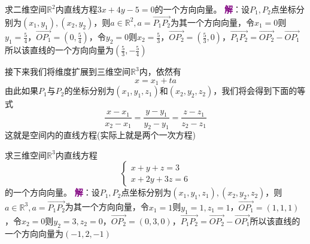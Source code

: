 \begin{example}
	求二维空间$\mathbb{R}^2$内直线方程$3x+4y-5=0$的一个方向向量。
	\tcblower
	\textcolor{purple}{\textbf{解}}：设$P_1,P_2$点坐标分别为$(x_1,y_1),(x_2,y_2)$，则$a\in \mathbb{R}^2,a=\overrightarrow{P_1P_2}$为其一个方向向量，令$x_1=0$则$\displaystyle y_1=\frac{5}{4}$，$\displaystyle \overrightarrow{OP_1}=\left( 0,\frac{5}{4} \right)$，令$y_2=0$则$\displaystyle x_2=\frac{5}{3}$，$\displaystyle \overrightarrow{OP_2}=\left(\frac{5}{3},0\right)$，$\overrightarrow{P_1P_2}=\overrightarrow{OP_2}-\overrightarrow{OP_1}$所以该直线的一个方向向量为$\displaystyle \left( \frac{5}{3},-\frac{5}{4} \right) $
\end{example}

接下来我们将维度扩展到三维空间$\mathbb{R}^3$内，依然有$$x=x_1+ta$$由此如果$P_1$与$P_2$的坐标分别为$(x_1,y_1,z_1)$和$(x_2,y_2,z_2)$，我们将会得到下面的等式$$\frac{x-x_1}{x_2-x_1}=\frac{y-y_1}{y_2-y_1}=\frac{z-z_1}{z_2-z_1}$$这就是空间内的直线方程(实际上就是两个一次方程)

\begin{example}
	求三维空间$\mathbb{R}^3$内直线方程$$\left\{\begin{matrix} 
		x+y+z=3 \\  
		x+2y+3z=6
	\end{matrix}\right. $$的一个方向向量。
	\tcblower
	\textcolor{purple}{\textbf{解}}：设$P_1,P_2$点坐标分别为$(x_1,y_1,z_1),(x_2,y_2,z_2)$，则$a\in \mathbb{R}^3,a=\overrightarrow{P_1P_2}$为其一个方向向量，令$x_1=1$则$\displaystyle y_1=1,z_1=1$，$\displaystyle \overrightarrow{OP_1}=\left( 1,1,1 \right)$，令$x_2=0$则$\displaystyle y_2=3,z_2=0$，$\displaystyle \overrightarrow{OP_2}=\left(0,3,0\right)$，$\overrightarrow{P_1P_2}=\overrightarrow{OP_2}-\overrightarrow{OP_1}$所以该直线的一个方向向量为$\displaystyle \left( -1,2,-1 \right) $
\end{example}